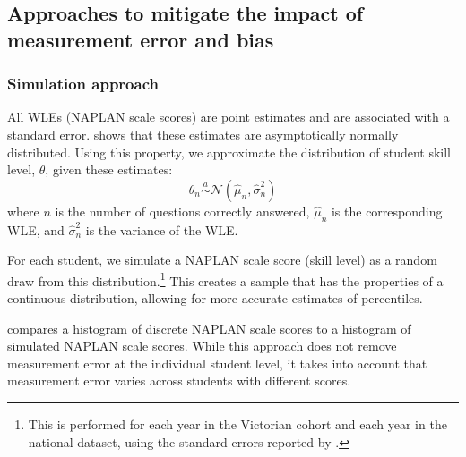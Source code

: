 \subsection{Approaches to mitigate the impact of measurement error and bias} \label{sec:pv}

\subsubsection*{Simulation approach}

All WLEs (NAPLAN scale scores) are point estimates and are associated with a standard error. \textcite{warm1989} shows that these estimates are asymptotically normally distributed. Using this property, we approximate the distribution of student skill level, $\theta$, given these estimates:
\begin{equation}
\theta_{n} \overset{a}\sim \mathcal{N}\left(\widehat{\mu}_{n},\widehat{\sigma}_{n}^{2} \right)
\end{equation}
where $n$ is the number of questions correctly answered, $\widehat{\mu}_{n}$ is the corresponding WLE, and $\widehat{\sigma}_{n}^{2}$ is the variance of the WLE. 

For each student, we simulate a NAPLAN scale score (skill level) as a random draw from this distribution.\footnote{This is performed for each year in the Victorian cohort and each year in the national dataset, using the standard errors reported by \textcite{acara2015d}.} This creates a sample that has the properties of a continuous distribution, allowing for more accurate estimates of percentiles.

 compares a histogram of discrete NAPLAN scale scores to a histogram of simulated NAPLAN scale scores. While this approach does not remove measurement error at the individual student level, it takes into account that measurement error varies across students with different scores.

